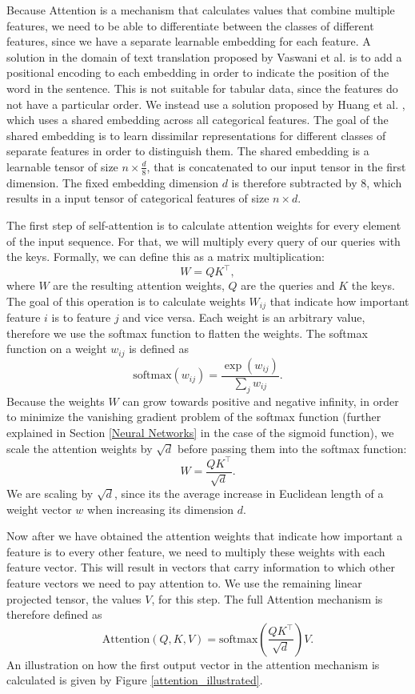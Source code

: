 Because Attention is a mechanism that calculates values that combine multiple features, we need to be able to differentiate between the classes of different features, since we have a separate learnable embedding for each feature. A solution in the domain of text translation proposed by Vaswani et al. \cite{attention_is_all_you_need} is to add a positional encoding to each embedding in order to indicate the position of the word in the sentence. This is not suitable for tabular data, since the features do not have a particular order. We instead use a solution proposed by Huang et al. \cite{tab_transformer}, which uses a shared embedding across all categorical features. The goal of the shared embedding is to learn dissimilar representations for different classes of separate features in order to distinguish them. The shared embedding is a learnable tensor of size $n \times \frac{d}{8}$, that is concatenated to our input tensor in the first dimension. The fixed embedding dimension $d$ is therefore subtracted by 8, which results in a input tensor of categorical features of size $n \times d$. 

The first step of self-attention is to calculate attention weights for every element of the input sequence. For that, we will multiply every query of our queries with the keys. Formally, we can define this as a matrix multiplication:
$$W = QK^\intercal,$$
where $W$ are the resulting attention weights, $Q$ are the queries and $K$ the keys. The goal of this operation is to calculate weights $W_{ij}$ that indicate how important feature $i$ is to feature $j$ and vice versa. Each weight is an arbitrary value, therefore we use the softmax function \cite{neural_networks_pattern_recognition} to flatten the weights. The softmax function on a weight $w_{ij}$ is defined as
$$\text{softmax}(w_{ij}) = \frac{\exp(w_{ij})}{\sum_j{w_{ij}}}.$$
Because the weights $W$ can grow towards positive and negative infinity, in order to minimize the vanishing gradient problem of the softmax function (further explained in Section \ref{Neural Networks} in the case of the sigmoid function), we scale the attention weights by $\sqrt{d}$ before passing them into the softmax function:
$$W = \frac{QK^\intercal}{\sqrt{d}}.$$
We are scaling by $\sqrt{d}$, since its the average increase in Euclidean length of a weight vector $w$ when increasing its dimension $d$. \cite{attention_is_all_you_need}

Now after we have obtained the attention weights that indicate how important a feature is to every other feature, we need to multiply these weights with each feature vector. This will result in vectors that carry information to which other feature vectors we need to pay attention to. We use the remaining linear projected tensor, the values $V$, for this step. The full Attention mechanism is therefore defined as
$$\text{Attention}(Q, K, V) = \text{softmax}(\frac{QK^\intercal}{\sqrt{d}})V.$$
An illustration on how the first output vector in the attention mechanism is calculated is given by Figure \ref{attention_illustrated}.

